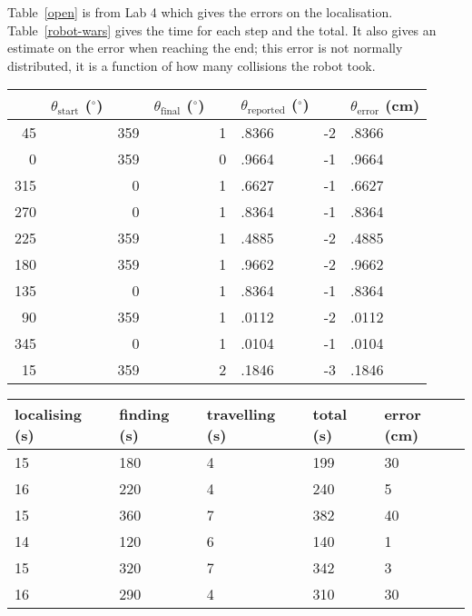 \documentclass[twocolumn]{article}
\def\degree{\ensuremath{^\circ}}
\begin{document}
\begin{enumerate}
Table~\ref{open} is from Lab 4\cite{alexneil4} which gives the errors on the localisation. Table~\ref{robot-wars} gives the time for each step and the total. It also gives an estimate on the error when reaching the end; this error is not normally distributed, it is a function of how many collisions the robot took.

\begin{table*}[htb]
\begin{center}\begin{tabular}{r@{}l r@{}l r@{}l r@{}l}
&$\theta_{\text{start}}$ (\degree)& &$\theta_{\text{final}}$ (\degree)& &$\theta_{\text{reported}}$ (\degree)& &$\theta_{\text{error}}$ (cm) \\
\hline
45&& 359&& 1&.8366& -2&.8366 \\
0&& 359&& 0&.9664& -1&.9664 \\
315&& 0&& 1&.6627& -1&.6627 \\
270&& 0&& 1&.8364& -1&.8364 \\
225&& 359&& 1&.4885& -2&.4885 \\
180&& 359&& 1&.9662& -2&.9662 \\
135&& 0&& 1&.8364& -1&.8364 \\
90&& 359&& 1&.0112& -2&.0112 \\
345&& 0&& 1&.0104& -1&.0104 \\
15&& 359&& 2&.1846& -3&.1846 \\
\end{tabular}\end{center}
\caption{The error mean is $-2.18$\,cm, variance is %
$0.46$\,cm$^{2}$, and the corrected sample standard deviation is %
$0.67$\,cm.\cite{alexneil4}}
\label{open}
\end{table*}

\begin{table*}[htb]
\begin{center}\begin{tabular}{l l l l l}
localising (s) & finding (s) & travelling (s) & total (s) & error (cm)\\
\hline
15& 180& 4& 199& 30 \\
16& 220& 4& 240& 5 \\
15& 360& 7& 382& 40 \\
14& 120& 6& 140& 1 \\
15& 320& 7& 342& 3 \\
16& 290& 4& 310& 30 \\
\end{tabular}\end{center}
\caption{The error mean is $18$\,cm, variance is $291$\,cm$^{2}$, and the corrected sample standard deviation is $17$\,cm.}
\label{robot-wars}
\end{table*}

\end{enumerate}
\end{document}
